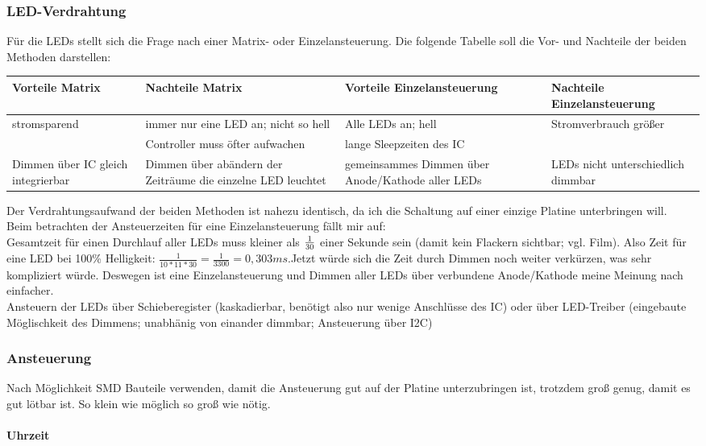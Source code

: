 \documentclass[11pt,a4paper,ngerman]{article}
\begin{document}
\subsubsection{LED-Verdrahtung}
Für die LEDs stellt sich die Frage nach einer Matrix- oder Einzelansteuerung. Die folgende Tabelle soll die Vor- und Nachteile der beiden Methoden darstellen:\\
\begin{tabular}[]{p{3cm}p{3cm}p{3cm}p{3cm}}
	\toprule
	Vorteile Matrix & Nachteile Matrix & Vorteile Einzelansteuerung  & Nachteile Einzelansteuerung\\
	\midrule
	stromsparend & immer nur eine LED an; nicht so hell & Alle LEDs an; hell & Stromverbrauch größer\\
	&Controller muss öfter aufwachen & lange Sleepzeiten des IC\\
	Dimmen über IC gleich integrierbar & Dimmen über abändern der Zeiträume die einzelne LED leuchtet & gemeinsammes Dimmen über Anode/Kathode aller LEDs & LEDs nicht unterschiedlich dimmbar
\end{tabular}
Der Verdrahtungsaufwand der beiden Methoden ist nahezu identisch, da ich die Schaltung auf einer einzige Platine unterbringen will.\\
Beim betrachten der Ansteuerzeiten für eine Einzelansteuerung fällt mir auf:\\
Gesamtzeit für einen Durchlauf aller LEDs muss kleiner als $1\over30$ einer Sekunde sein (damit kein Flackern sichtbar; vgl. Film). Also Zeit für eine LED bei 100\% Helligkeit: $\frac{1}{10*11*30} = \frac{1}{3300}=0,303ms$.Jetzt würde sich die Zeit durch Dimmen noch weiter verkürzen, was sehr kompliziert würde. Deswegen ist eine Einzelansteuerung und Dimmen aller LEDs über verbundene Anode/Kathode meine Meinung nach einfacher.\\
Ansteuern der LEDs über Schieberegister (kaskadierbar, benötigt also nur wenige Anschlüsse des IC) oder über LED-Treiber (eingebaute Möglischkeit des Dimmens; unabhänig von einander dimmbar; Ansteuerung über I2C)

\subsubsection{Ansteuerung}
Nach Möglichkeit SMD Bauteile verwenden, damit die Ansteuerung gut auf der Platine unterzubringen ist, trotzdem groß genug, damit es gut lötbar ist. So klein wie möglich so groß wie nötig.
\paragraph{Uhrzeit}
\end{document}
